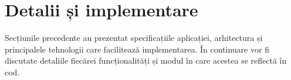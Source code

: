 \chapter{Detalii și implementare}

Secțiunile precedente au prezentat specificațiile aplicației, arhitectura și principalele tehnologii care facilitează implementarea. În continuare vor fi discutate detaliile fiecărei funcționalități și modul în care acestea se reflectă în cod.






